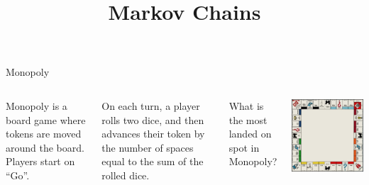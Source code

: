 \documentclass[xcolor=dvipsnames,aspectratio=169,t]{beamer}
\title{Markov Chains}
\begin{document}
\maketitle

\begin{frame}{Monopoly}
  \begin{columns}[T]
  \bigskip

  Monopoly is a board game where tokens are moved around the board. Players start on ``Go''.%
  \bigskip
  
  On each turn, a player rolls two dice, and then advances their token by the number of spaces equal to the sum of the rolled dice.
  \bigskip
  
  What is the most landed on spot in Monopoly?
  
  \includegraphics[scale=0.525]{images/Monopoly-board.png}
  \end{columns}
\end{frame}
\end{document}
